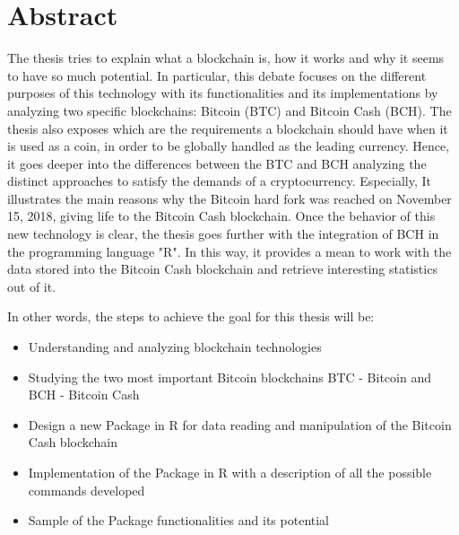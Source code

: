 \chapter*{Abstract} %
\label{abstract}


The thesis tries to explain what a blockchain is, 
how it works and why it seems to have so much potential. 
In particular, this debate focuses on the different purposes of this
technology with its functionalities and its implementations by 
analyzing two specific blockchains: Bitcoin (BTC) and Bitcoin Cash (BCH). 
The thesis also exposes which are the requirements 
a blockchain should have when it is used as a coin, in order to be 
globally handled as the leading currency. Hence, it goes deeper into the
differences between the BTC and BCH analyzing the distinct approaches to 
satisfy the demands of a cryptocurrency. Especially, It illustrates
the main reasons why the Bitcoin hard fork was reached on November 15, 
2018, giving life to the Bitcoin Cash blockchain.
Once the behavior of this new technology is clear, the thesis goes 
further with the integration of BCH in the programming language "R".
In this way, it provides a mean to work with the data stored into the Bitcoin
Cash blockchain and retrieve interesting statistics out of it.

  In other words, the steps to achieve the goal for this thesis will be:



\begin{itemize}
  \item Understanding and analyzing blockchain technologies
  \item Studying the two most important Bitcoin blockchains BTC - Bitcoin and BCH - Bitcoin Cash
  \item Design a new Package in R for data reading and manipulation of the Bitcoin Cash blockchain  
  \item Implementation of the Package in R with a description of all the possible commands developed 
  \item Sample of the Package functionalities and its potential
\end{itemize}




